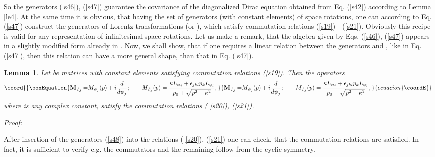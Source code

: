 \documentclass[a4paper,a4paper]{article}
\newtheorem{lemma}[theorem]{Lemma}
\begin{document}
So the generators (\ref{s46}), (\ref{s47}) guarantee the covariance of the
diagonalized Dirac equation obtained from Eq. (\ref{s42}) according to Lemma %
\ref{le4}. At the same time it is obvious, that having the set of generators 
\coordHE{} (with constant elements) of space rotations, one can
according to Eq. (\ref{s47}) construct the generators of Lorentz
transformations \coordHE{} (or \coordHE{}), which
satisfy commutation relations (\ref{s19}) - (\ref{s21}). Obviously this
recipe is valid for any representation of infinitesimal space rotations. Let
us make a remark, that the algebra given by Eqs. (\ref{s46}), (\ref{s47})
appears in a slightly modified form already in \cite{foldy56}. Now, we shall
show, that if one requires a linear relation between the generators \coordHE{} and \coordHE{}, like in Eq. (\ref{s47}), then this relation
can have a more general shape, than that in Eq. (\ref{s47}).

\begin{lemma}
\label{le5}Let \coordHE{} be matrices with constant elements
satisfying commutation relations (\ref{s19}). Then the operators 
\begin{equation}\coord{}\boxEquation{
\mathbf{M_{\psi _{j}}=}M_{\psi _{j}}(p)+i\frac{d}{d\psi _{j}};\qquad M_{\psi
_{j}}(p)=\frac{\kappa L_{\varphi _{j}}+\epsilon _{jkl}p_{k}L_{\varphi _{l}}}{
p_{0}+\sqrt{p^{2}-\kappa ^{2}}},  \label{s48}
}{
\mathbf{M_{\psi _{j}}=}M_{\psi _{j}}(p)+i\frac{d}{d\psi _{j}};\qquad M_{\psi
_{j}}(p)=\frac{\kappa L_{\varphi _{j}}+\epsilon _{jkl}p_{k}L_{\varphi _{l}}}{
p_{0}+\sqrt{p^{2}-\kappa ^{2}}},  }{ecuacion}\coordE{}\end{equation}%
where \myHighlight{$\kappa $}\coordHE{} is any complex constant, satisfy the commutation relations (%
\ref{s20}), (\ref{s21}).
\end{lemma}

\noindent \textit{Proof:}

\noindent After insertion of the generators (\ref{s48}) into the relations (%
\ref{s20}), (\ref{s21}) one can check, that the commutation relations are
satisfied. In fact, it is sufficient to verify e.g. the commutators \coordHE{} and \coordHE{} the remaining follow from the cyclic symmetry.
\end{document}
